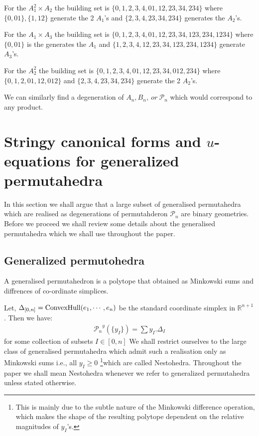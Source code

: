 \documentclass[hidelinks,12pt]{article}
\newcommand{\bea}[1]{\begin{eqnarray}\label{#1} }
\newcommand{\eea}{\end{eqnarray}}
\def\bea{\begin{eqnarray}}
\def\eea{\end{eqnarray}}
\begin{document}
For the $A_1^{2} \times A_2$ the building set is $ \{ {0},{1},{2},{3},{4},{01},{12},{23},{34},{234} \}$ where $\{0,01\} , \{1,12\} $ generate the 2 $A_1$'s and $\{2,3,4,23,34,234\}$ generates the $A_2$'s.

For the $A_1 \times A_3$ the building set is $ \{ {0},{1},{2},{3},{4},{01},{12},{23},{34},{123},{234},{1234} \}$ where $\{0,01\}$ is the generates the $A_1$ and $\{{1},{2},{3},{4},{12},{23},{34},{123},{234},{1234} \}$ generate  $A_3$'s.

For the $A_2^{2}$ the building set is $ \{ {0},{1},{2},{3},{4},{01},{12},{23},{34} ,{012},{234}\}$ where $\{0,1,2,01,12,012\}$  and $\{2,3,4,23,34,234\}$ generate the 2 $A_2$'s.

We can similarly find a degeneration of $A_n,B_n,~or~ {\mathscr P_n}$ which would correspond to any product.


\section{Stringy canonical forms and $u$-equations for generalized permutahedra}
In this section we shall argue that  a large subset of generalised permutahedra which are realised as degenerations of permutahderon ${\mathscr P_n}$ are binary geometries. Before we proceed we shall review some details about the generalised permutahedra which we shall use throughout the paper.
\subsection{Generalized permutohedra} 
A generalised permutahedron is a polytope that obtained as Minkowski sums and diffrences of co-ordinate simplices. 

Let, $\Delta_{[0,n]} = {\rm ConvexHull}(e_1,\cdots,e_n)$ be the standard coordinate simplex in $\mathbb{R}^{n+1}$. Then we have:
  \bea
{\mathscr P_n}^y(\{y_I \})= \sum y_I . \Delta_I  
 \eea
 for some collection of subsets $I \in [0,n]$
 We shall restrict ourselves to the large class of generalised permutahedra which admit such a realisation only as Minkowski sums i.e., all $y_I \ge 0$ \footnote{This is mainly due to the subtle nature of the Minkowski difference operation, which makes the shape of the resulting polytope dependent on the relative magnitudes of $y_I$'s.}which are called Nestohedra. Throughout the paper we shall mean Nestohedra whenever we refer to generalized permutahedra unless stated otherwise.\\
 
\end{document}
